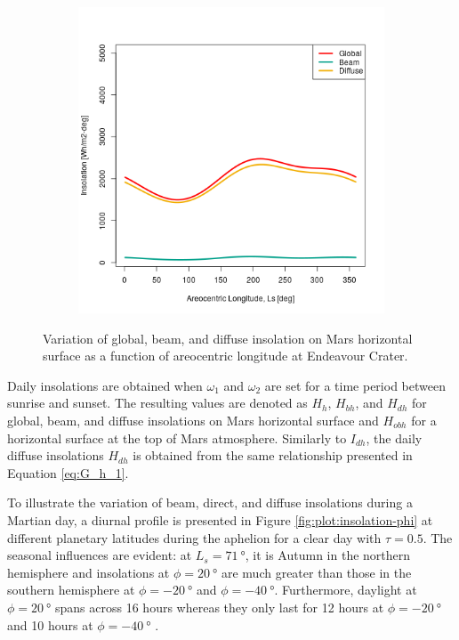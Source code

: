 \begin{figure}[H]
\begin{subfigure}[t]{\subfigureWidth}
  		\label{fig:sub:insolation-ls-tau-factor-2}
  	\end{subfigure}\hfill
	   \begin{subfigure}[t]{\subfigureWidth}
      \centering
  		\includegraphics[height=\graphicsHeight]{sections/martian-environment/plots/variation-of-global-beam-and-diffuse-insolation-on-mars-horizontal-surface-as-a-function-of-areocentric-longitude-for-tau3-and-phi205.png}
  		\label{fig:sub:insolation-ls-tau-factor-3}
	   \end{subfigure}\hfill
	\caption{Variation of global, beam, and diffuse insolation on Mars horizontal surface as a function of areocentric longitude at Endeavour Crater.}
	\label{fig:plot:insolation-ls}
\vspace{-2ex}
\end{figure}

Daily insolations are obtained when $\omega_1$ and $\omega_2$ are set for a time period between sunrise and sunset. The resulting values are denoted as $H_{h}$, $H_{bh}$, and $H_{dh}$ for global, beam, and diffuse insolations on Mars horizontal surface and $H_{obh}$ for a horizontal surface at the top of Mars atmosphere. Similarly to $I_{dh}$, the daily diffuse insolations $H_{dh}$ is obtained from the same relationship presented in Equation \ref{eq:G_h_1}.

To illustrate the variation of beam, direct, and diffuse insolations during a Martian day, a diurnal profile is presented in Figure \ref{fig:plot:insolation-phi} at different planetary latitudes during the aphelion for a clear day with $\tau = 0.5$. The seasonal influences are evident: at $L_{s} = \SI{71}{\degree}$, it is Autumn in the northern hemisphere and insolations at $\phi = \SI{20}{\degree}$ are much greater than those in the southern hemisphere at $\phi = \SI{-20}{\degree}$ and $\phi = \SI{-40}{\degree}$. Furthermore, daylight at $\phi = \SI{20}{\degree}$ spans across 16 hours whereas they only last for 12 hours at $\phi = \SI{-20}{\degree}$ and 10 hours at $\phi = \SI{-40}{\degree}$ .


